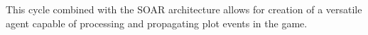 This cycle combined with the SOAR architecture allows for creation of a versatile agent capable of processing and propagating plot events in the game.




